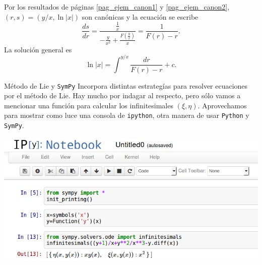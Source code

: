 \documentclass{article}
\begin{document}
Por los resultados de páginas \ref{pag_ejem_canon1} y \ref{pag_ejem_canon2}, $(r,s)=(y/x,\ln|x|)$ son canónicas y la ecuación se escribe
\[\frac{ds}{dr}=\frac{\frac{1}{x}}{-\frac{y}{x^2}+\frac{F\left(\frac{y}{x}\right)}{x}}=\frac{1}{F(r)-r}.\]
La solución general es 
\[\ln|x|=\int^{y/x}\frac{dr}{F(r)-r}+c.\]




{Método de Lie y \texttt{SymPy}}
 Incorpora distintas estrategías para resolver ecuaciones por el método de Lie. Hay mucho por indagar al respecto, pero sólo vamos a mencionar una función para calcular los infinitesimales $(\xi,\eta)$.  Aprovechamos para mostrar como luce una consola de \texttt{ipython}, otra manera de usar \texttt{Python} y \texttt{SymPy}.

\includegraphics[scale=.45]{imagenes/ipython.png}
\end{document}
